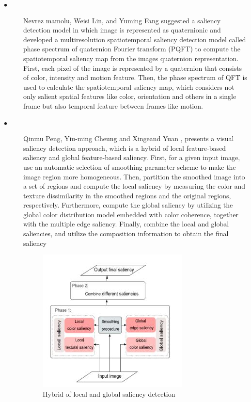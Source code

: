 \begin{description}
\begin{figure}[h!]
\end{figure}

\item[$\bullet$]Nevrez mamolu, Weisi Lin, and Yuming Fang \cite{imamoglu2013saliency} 
suggested a saliency detection model in which image is
represented as quaternionic and developed a multiresolution
spatiotemporal saliency detection model called phase
spectrum of quaternion Fourier transform (PQFT) to compute
the spatiotemporal saliency map from the images quaternion
representation. First, each pixel of the image is represented by
a quaternion that consists of color, intensity and motion
feature. Then, the phase spectrum of QFT is used to calculate
the spatiotemporal saliency map, which considers not only
salient spatial features like color, orientation and others in a
single frame but also temporal feature between frames like
motion.

\item[$\bullet$] Qinmu Peng, Yiu-ming Cheung and Xingeand Yuan \cite{peng2017hybrid} , presents a visual saliency detection approach,
which is a hybrid of local feature-based saliency and global
feature-based saliency. First, for a given input image, use an
automatic selection of smoothing parameter scheme to make
the image region more homogeneous. Then, partition the
smoothed image into a set of regions and compute the local
saliency by measuring the color and texture dissimilarity in
the smoothed regions and the original regions, respectively.
Furthermore, compute the global saliency by utilizing the
global color distribution model embedded with color
coherence, together with the multiple edge saliency. Finally,
combine the local and global saliencies, and utilize the
composition information to obtain the final saliency

\begin{figure}[h!]
  \centering
  \includegraphics[width=.5\textwidth,height=.6\textwidth]{pictures/figure2.JPG}
  \caption[]{Hybrid of local and global saliency detection\cite{peng2017hybrid}}
  \label{orangeleaf}


\end{figure}
\end{description}
